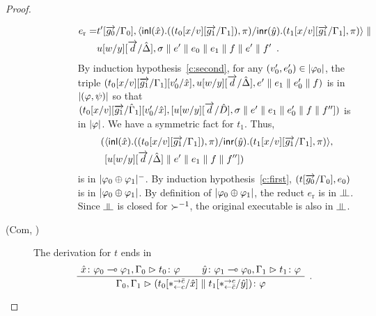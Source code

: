 \begin{proof}
\begin{description}
\begin{enumerate}[label=\textit{(\arabic{*})}]
\begin{description}
\begin{align*}
                     e_{\mathrm r} =&
                      t'[\overrightarrow{g_0}/\Gamma_0],
                      \langle \mathsf{inl}({\hat x}). ({(t_0[x/v][\overrightarrow{g_1}/\Gamma_1])},{\pi})/ \mathsf{inr}({\hat y}). ({t_1[x/v][\overrightarrow{g_1}/\Gamma_1]},{\pi})\rangle\parallel \\
                     &u[w/y][\overrightarrow d/\hat{\Delta}],\sigma\parallel e'\parallel
                      {e_0}\parallel {e_1}\parallel  f\parallel e'\parallel f'\enspace.
                    \end{align*}
                    By induction hypothesis~\ref{c:second}, for any
                    $(v_0',e_0')\in|{\varphi_0}|$,
                    the triple
                    $(t_0[x/v][\overrightarrow{g_1}/\Gamma_1][v_0'/\hat x],
                    u[w/y][\overrightarrow d/\hat {\Delta}], e'\parallel {e_1}\parallel
                    e_0'\parallel  f)$ is in $|{(\varphi,\psi)}|$ so
                    that
                    $(t_0[x/v][\overrightarrow{g_1}/\hat{\Gamma}_1][v_0'/\hat x],
                    [u[w/y][\overrightarrow d/\hat D],\sigma\parallel e'\parallel
                    {e_1}\parallel e_0'\parallel {f}\parallel f''])$ is in
                    $|{\varphi}|$.
                    We have a symmetric fact for $t_1$.
                    Thus,
                    \begin{align*}
                    (
                     & \langle \mathsf{inl}({\hat x}). ({(t_0[x/v][\overrightarrow{g_1}/\Gamma_1])},{\pi})/ \mathsf{inr}({\hat y}). ({t_1[x/v][\overrightarrow{g_1}/\Gamma_1]},{\pi})\rangle, \\ &
                     [u[w/y][\overrightarrow{d}/\hat{\Delta}]\parallel e'\parallel {e_1}\parallel
                      f\parallel f'']
                    )
                    \end{align*}
                    is in $|{\varphi_0\oplus\varphi_1}|^-$.
                    By induction hypothesis~\ref{c:first},
                    $(t[\overrightarrow{g_0}/\Gamma_0],{e_0})$ is in
                    $|{\varphi_0\oplus\varphi_1}|$.
                    By definition of $|{\varphi_0\oplus\varphi_1}|$,
                    the reduct $e_{\mathrm r}$ is in $\bbot$.
                    Since $\bbot$ is closed for ${\succ}^{-1}$,
                    the original executable is also in $\bbot$.
              \end{description}
       \end{enumerate}
   \item[(Com, \textminus)]
	The derivation for $t$ ends in
	\[
	\aseq{\tj{\hat x}{\phi_0\limp\phi_1},\G_0}{\tj{t_0}{\phi}}
	\aseq{\tj{\hat y}{\phi_1\limp\phi_0},\G_1}{\tj{t_1}{\phi}}
	\bseq{\G_0,\G_1}{\tj{(t_0[\comodL/\hat x]\conc t_1
	[\comodR/\hat y])}{\phi}}
	\DisplayProof\enspace.
	\]
	\begin{enumerate}[label=\textit{(\arabic{*})}]

\end{enumerate}
\end{description}
\end{proof}
